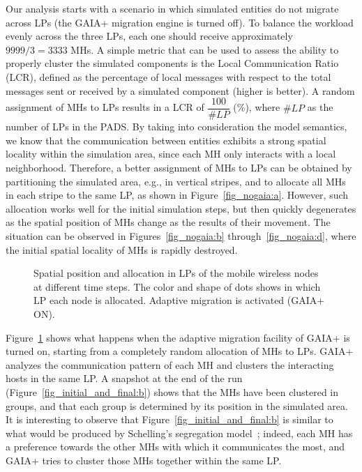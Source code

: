 \documentclass[1p]{elsarticle}
\begin{document}
Our analysis starts with a scenario in which simulated entities do not
migrate across LPs (the GAIA+ migration engine is turned off).  To
balance the workload evenly across the three LPs, each one should
receive approximately $9999 / 3 = 3333$ MHs.  A simple metric that can
be used to assess the ability to properly cluster the simulated
components is the Local Communication Ratio (LCR), defined as the
percentage of local messages with respect to the total messages sent
or received by a simulated component (higher is better). A random
assignment of MHs to LPs results in a LCR of $\dfrac{100}{\#LP}$ (\%),
where $\#LP$ as the number of LPs in the PADS. By taking into
consideration the model semantics, we know that the communication
between entities exhibits a strong spatial locality within the
simulation area, since each MH only interacts with a local
neighborhood. Therefore, a better assignment of MHs to LPs can be
obtained by partitioning the simulated area, e.g., in vertical
stripes, and to allocate all MHs in each stripe to the same LP, as
shown in Figure~\ref{fig_nogaia:a}. However, such allocation works
well for the initial simulation steps, but then quickly degenerates as
the spatial position of MHs change as the results of their movement.
The situation can be observed in Figures~\ref{fig_nogaia:b}
through~\ref{fig_nogaia:d}, where the initial spatial locality of MHs
is rapidly destroyed.

\begin{figure}[ht]
\centering
{}
\caption{Spatial position and allocation in LPs of the mobile wireless
  nodes at different time steps. The color and shape of dots shows in
  which LP each node is allocated. Adaptive migration is activated
  (GAIA+ ON).}
\label{fig_initial_and_final}
\end{figure}

Figure~\ref{fig_initial_and_final} shows what happens when the
adaptive migration facility of GAIA+ is turned on, starting from a
completely random allocation of MHs to LPs.  GAIA+ analyzes the
communication pattern of each MH and clusters the interacting hosts in
the same LP. A snapshot at the end of the run
(Figure~\ref{fig_initial_and_final:b}) shows that the MHs have been
clustered in groups, and that each group is determined by its position
in the simulated area. It is interesting to observe that
Figure~\ref{fig_initial_and_final:b} is similar to what would be
produced by Schelling's segregation model~\cite{segregation}; indeed,
each MH has a preference towards the other MHs with which it
communicates the most, and GAIA+ tries to cluster those MHs together
within the same LP.
\end{document}
